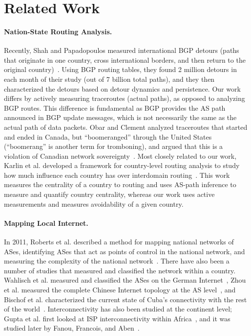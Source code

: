 \section{Related Work}
\label{related}

\paragraph{Nation-State Routing Analysis.}  Recently, Shah and
Papadopoulos measured international BGP detours (paths that originate in
one country, cross international borders, and then return to the
original country)~\cite{shah2015characterizing}.  Using BGP routing
tables, they found 2 million detours in each month of their study (out
of 7 billion total paths), and they then characterized the detours based
on detour dynamics and persistence.  Our work differs by actively
measuring traceroutes (actual paths), as opposed to analyzing BGP
routes.  This difference is fundamental as BGP provides the AS path
announced in BGP update messages, which is not necessarily the same as
the actual path of data packets.  Obar and Clement analyzed traceroutes
that started and ended in Canada, but ``boomeranged'' through the United
States (``boomerang'' is another term for tromboning), and argued that
this is a violation of Canadian network
sovereignty~\cite{obar2012internet}.  Most closely related to our work,
Karlin et al. developed a framework for country-level
routing analysis to study how much influence each country has over
interdomain routing~\cite{karlin2009nation}.  This work measures the
centrality of a country to routing and uses AS-path inference to measure
and quantify country centrality, whereas our work uses active
measurements and measures avoidability of a given country. 

\paragraph{Mapping Local Internet.}  In 2011, Roberts et al. described
a method for mapping national networks of ASes, identifying ASes that
act as points of control in the national network, and measuring the
complexity of the national network~\cite{roberts2011mapping}.  There
have also been a number of studies that measured and classified the
network within a country.  Wahlisch et al. measured and classified the
ASes on the German Internet~\cite{wahlisch2010framework,
  wahlisch2012exposing}, Zhou et al. measured the complete
Chinese Internet topology at the AS level~\cite{zhou2007chinese}, and
Bischof et al. characterized the current state of Cuba's
connectivity with the rest of the world~\cite{bischof2015and}.
Interconnectivity has also been studied at the continent level; Gupta
et al. first looked at ISP interconnectivity within
Africa~\cite{gupta2014peering}, and it was studied later by Fanou,
Francois, and Aben~\cite{fanou2015diversity}. 


